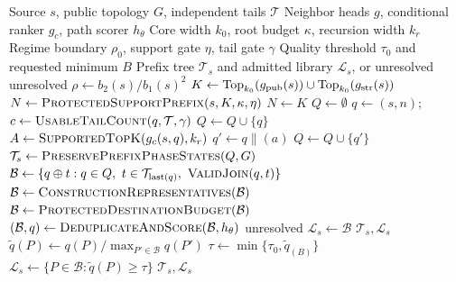\begin{algorithm}[t]
\caption{Prefix-Anchored Tail Stitching and Admission}
\label{alg:path_synthesis}
\footnotesize
\begin{algorithmic}[1]
\Require Source $s$, public topology $G$, independent tails $\mathcal T$
\Require Neighbor heads $g$, conditional ranker $g_c$, path scorer $h_\theta$
\Require Core width $k_0$, root budget $\kappa$, recursion width $k_r$
\Require Regime boundary $\rho_0$, support gate $\eta$, tail gate $\gamma$
\Require Quality threshold $\tau_0$ and requested minimum $B$
\Ensure Prefix tree $\mathcal T_s$ and admitted library $\mathcal L_s$, or unresolved
  \State \Return unresolved
\EndIf
\State $\rho\gets b_2(s)/b_1(s)^2$
\State $K\gets\operatorname{Top}_{k_0}(g_{\rm pub}(s))\cup\operatorname{Top}_{k_0}(g_{\rm str}(s))$
  \State $N\gets\Call{ProtectedSupportPrefix}{s,K,\kappa,\eta}$
\Else
  \State $N\gets K$
\EndIf
\State $Q\gets\emptyset$
  \State $q\gets(s,n)$; $c\gets\Call{UsableTailCount}{q,\mathcal T,\gamma}$
    \State $Q\gets Q\cup\{q\}$
  \EndIf
    \State $A\gets\Call{SupportedTopK}{g_c(s,q),k_r}$
      \State $q'\gets q\mathbin{\|}(a)$
        \State $Q\gets Q\cup\{q'\}$
      \EndIf
    \EndFor
  \EndIf
\EndFor
\State $\mathcal T_s\gets\Call{PreservePrefixPhaseStates}{Q,G}$
\State $\mathcal B\gets\{q\oplus t:q\in Q,\ t\in\mathcal T_{\mathrm{last}(q)},\ \Call{ValidJoin}{q,t}\}$
\State $\mathcal B\gets\Call{ConstructionRepresentatives}{\mathcal B}$
\State $\mathcal B\gets\Call{ProtectedDestinationBudget}{\mathcal B}$
\State $(\mathcal B,q)\gets\Call{DeduplicateAndScore}{\mathcal B,h_\theta}$
  \State \Return unresolved 
\EndIf
{}
  \State $\mathcal L_s\gets\mathcal B$ 
  \State \Return $\mathcal T_s,\mathcal L_s$
\EndIf
\State $\widetilde q(P)\gets q(P)/\max_{P'\in\mathcal B}q(P')$
\State $\tau\gets\min\{\tau_0,\widetilde q_{(B)}\}$
\State $\mathcal L_s\gets\{P\in\mathcal B:\widetilde q(P)\geq\tau\}$
\State \Return $\mathcal T_s,\mathcal L_s$ 
\end{algorithmic}
\end{algorithm}
